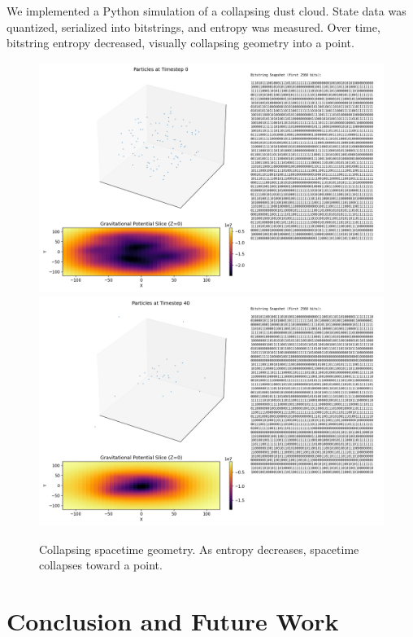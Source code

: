 \documentclass[11pt]{article}
\begin{document}
We implemented a Python simulation of a collapsing dust cloud. State data was quantized, serialized into bitstrings, and entropy was measured. Over time, bitstring entropy decreased, visually collapsing geometry into a point.

\begin{figure}[h!]
  \centering
  \includegraphics[width=1.0\textwidth]{figures/collapse_0.png}
  \includegraphics[width=1.0\textwidth]{figures/collapse_40.png}
  \caption{Collapsing spacetime geometry. As entropy decreases, spacetime collapses toward a point.}
  \label{fig:vanishing_entropy}
\end{figure}

\section{Conclusion and Future Work}
\end{document}
